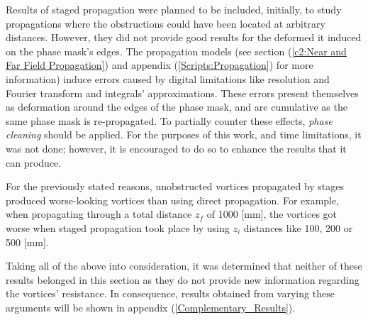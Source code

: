 Results of staged propagation were planned to be included, initially, to study propagations where the obstructions could have been located at arbitrary distances. However, they did not provide good results for the deformed it induced on the phase mask's edges. The propagation models (see section (\ref{c2:Near and Far Field Propagation}) and appendix (\ref{Scripts:Propagation}) for more information) induce errors caused by digital limitations like resolution and Fourier transform and integrals' approximations. These errors present themselves as deformation around the edges of the phase mask, and are cumulative as the same phase mask is re-propagated. To partially counter these effects, \textit{phase cleaning} should be applied. For the purposes of this work, and time limitations, it was not done; however, it is encouraged to do so to enhance the results that it can produce. 

For the previously stated reasons, unobstructed vortices propagated by stages produced worse-looking vortices than using direct propagation. For example, when propagating through a total distance $z_f$ of 1000 [mm], the vortices got worse when staged propagation took place by using $z_i$ distances like 100, 200 or 500 [mm].

Taking all of the above into consideration, it was determined that neither of these results belonged in this section as they do not provide new information regarding the vortices' resistance. In consequence, results obtained from varying these arguments will be shown in appendix (\ref{Complementary_Results}).

